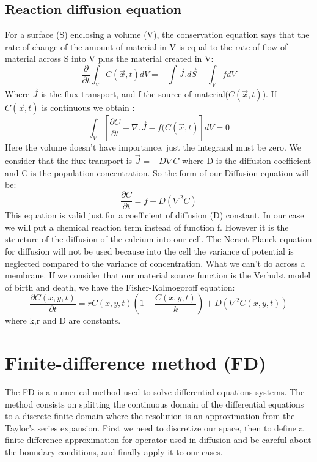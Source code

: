 \documentclass[a4paper,11pt]{report}
\begin{document}
\subsection{Reaction diffusion equation}
For a surface (S) enclosing a volume (V), the conservation equation says that the rate of change of the amount of material in V is equal to the rate of flow of material across S into V plus the material created in V:
$$\frac{\partial}{\partial t} \int_{V} C(\vec{x},t)dV=- \int \vec{J}.\vec{dS} + \int_{V}f dV
$$
Where $\vec{J}$ is the flux transport, and f the source of material($C(\vec{x},t)$).
If $C(\vec{x},t)$ is continuous we obtain :
$$
\int_{V}[\frac{\partial C }{\partial t}+ \nabla  . \vec{J}-f(C(\vec{x},t)]dV=0$$
Here the volume doesn't have importance, just the integrand must be zero. We consider that the flux transport is $\vec{J}=-D \nabla C $ where D is the diffusion coefficient and C is the population concentration. So the form of our Diffusion equation will be:
$$
\frac{\partial C}{\partial t}= f + D( \nabla ^{2}C) 
$$
This equation is valid just for a coefficient of diffusion (D) constant. In our case we will put a chemical reaction term instead of function f. However it is the structure of the diffusion of the calcium into our cell. The Nersnt-Planck equation for diffusion will not be used because into the cell the variance of potential is neglected compared to the variance of concentration. What we can't do across a membrane. 
If we consider that our material source function is the Verhulst model of birth and death, we have the Fisher-Kolmogoroff equation:
$$
\frac{\partial C(x,y,t)}{\partial t}=rC(x,y,t)(1-\frac{C(x,y,t)}{k})+D( \nabla ^{2}C(x,y,t))
$$
where k,r and D are constants. \cite{Murray2001} 
\section{Finite-difference method (FD)}
The FD is a numerical method used to solve differential equations systems. The method consists on splitting the continuous domain of the differential equations to a discrete finite domain where the resolution is an approximation from the Taylor's series expansion. First we need to discretize our space, then to define a finite difference approximation for operator used in diffusion and be careful about the boundary conditions, and finally apply it to our cases.
\end{document}
